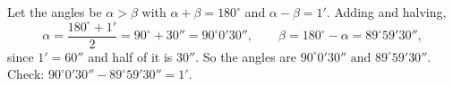 Let the angles be $\alpha>\beta$ with $\alpha+\beta=180^\circ$ and $\alpha-\beta=1'$. Adding and halving,
\[
\alpha=\dfrac{180^\circ+1'}{2}=90^\circ+30''=90^\circ0'30'',\qquad \beta=180^\circ-\alpha=89^\circ59'30'' ,
\]
since $1'=60''$ and half of it is $30''$. So the angles are $\boxed{90^\circ0'30''\text{ and }89^\circ59'30''}$. Check: $90^\circ0'30''-89^\circ59'30''=1'$.
